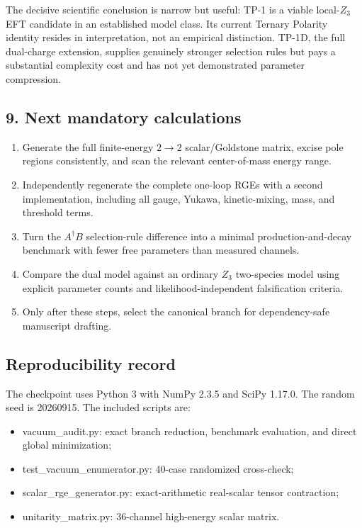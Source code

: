 \documentclass[
]{article}
\providecommand{\tightlist}{%
  \setlength{\itemsep}{0pt}\setlength{\parskip}{0pt}}
\begin{document}
The decisive scientific conclusion is narrow but useful: TP-1 is a
viable local-\(Z_3\) EFT candidate in an established model class. Its
current Ternary Polarity identity resides in interpretation, not an
empirical distinction. TP-1D, the full dual-charge extension, supplies
genuinely stronger selection rules but pays a substantial complexity
cost and has not yet demonstrated parameter compression.

\hypertarget{next-mandatory-calculations}{%
\subsection{9. Next mandatory
calculations}\label{next-mandatory-calculations}}

\begin{enumerate}
\def\labelenumi{\arabic{enumi}.}
\tightlist
\item
  Generate the full finite-energy \(2\to2\) scalar/Goldstone matrix,
  excise pole regions consistently, and scan the relevant center-of-mass
  energy range.
\item
  Independently regenerate the complete one-loop RGEs with a second
  implementation, including all gauge, Yukawa, kinetic-mixing, mass, and
  threshold terms.
\item
  Turn the \(A^\dagger B\) selection-rule difference into a minimal
  production-and-decay benchmark with fewer free parameters than
  measured channels.
\item
  Compare the dual model against an ordinary \(Z_3\) two-species model
  using explicit parameter counts and likelihood-independent
  falsification criteria.
\item
  Only after these steps, select the canonical branch for
  dependency-safe manuscript drafting.
\end{enumerate}

\hypertarget{reproducibility-record}{%
\subsection{Reproducibility record}\label{reproducibility-record}}

The checkpoint uses Python 3 with NumPy 2.3.5 and SciPy 1.17.0. The
random seed is 20260915. The included scripts are:

\begin{itemize}
\tightlist
\item
  vacuum\_audit.py: exact branch reduction, benchmark evaluation, and
  direct global minimization;
\item
  test\_vacuum\_enumerator.py: 40-case randomized cross-check;
\item
  scalar\_rge\_generator.py: exact-arithmetic real-scalar tensor
  contraction;
\item
  unitarity\_matrix.py: 36-channel high-energy scalar matrix.
\end{itemize}
\end{document}
